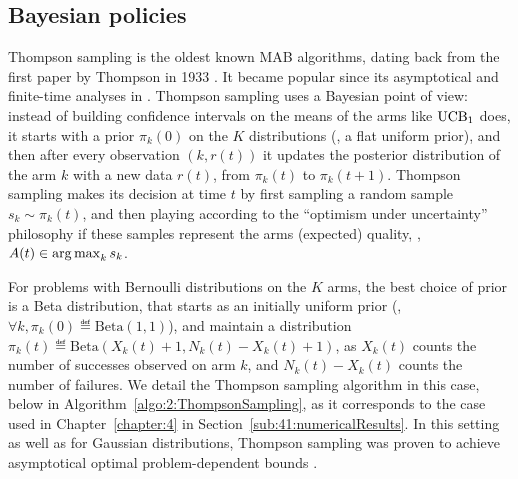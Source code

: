 

\subsection{Bayesian policies}
\label{sub:2:BayesianPolicies}



Thompson sampling is the oldest known MAB algorithms, dating back from the first paper by Thompson in 1933 \cite{Thompson33}.
It became popular since its asymptotical and finite-time analyses in \cite{AgrawalGoyal11,Kaufmann12Thompson}.
%
Thompson sampling uses a Bayesian point of view:
instead of building confidence intervals on the means of the arms like $\mathrm{UCB}_1$ does,
it starts with a prior $\pi_k(0)$ on the $K$ distributions (\eg, a flat uniform prior), and then after every observation $(k, r(t))$ it updates the posterior distribution of the arm $k$ with a new data $r(t)$, from $\pi_k(t)$ to $\pi_k(t+1)$.
Thompson sampling makes its decision at time $t$ by first sampling a random sample $s_k \sim \pi_k(t)$, and then playing according to the ``optimism under uncertainty'' philosophy if these samples represent the arms (expected) quality, \ie, $A(t) \in \operatorname*{arg\,max}_k s_k$.

For problems with Bernoulli distributions on the $K$ arms,
the best choice of prior is a Beta distribution, that starts as an initially uniform prior (\ie, $\forall k, \pi_k(0) \eqdef \mathrm{Beta}(1,1)$),
and maintain a distribution $\pi_k(t) \eqdef \mathrm{Beta}(X_k(t)+1,N_k(t)-X_k(t)+1)$,
as $X_k(t)$ counts the number of successes observed on arm $k$, and $N_k(t)-X_k(t)$ counts the number of failures.
%
We detail the Thompson sampling algorithm in this case, below in Algorithm~\ref{algo:2:ThompsonSampling}, as it corresponds to the case used in Chapter~\ref{chapter:4} in Section~\ref{sub:41:numericalResults}.
%
In this setting as well as for Gaussian distributions,
Thompson sampling was proven to achieve asymptotical optimal problem-dependent bounds \cite{Kaufmann12Thompson,AgrawalGoyal11}.


